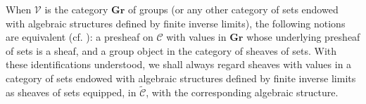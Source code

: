 When \(\mathscr V\) is the category \(\mathbf{Gr}\) of groups (or any
other category of sets endowed with algebraic structures defined by finite
inverse limits), the following notions are equivalent (cf. ): a
presheaf on \(\mathscr C\) with values in \(\mathbf{Gr}\) whose underlying
presheaf of sets is a sheaf, and a group object in the category of sheaves
of sets. With these identifications understood, we shall always regard
sheaves with values in a category of sets endowed with algebraic structures
defined by finite inverse limits as sheaves of sets equipped, in
\(\widetilde{\mathscr C}\), with the corresponding algebraic structure.

